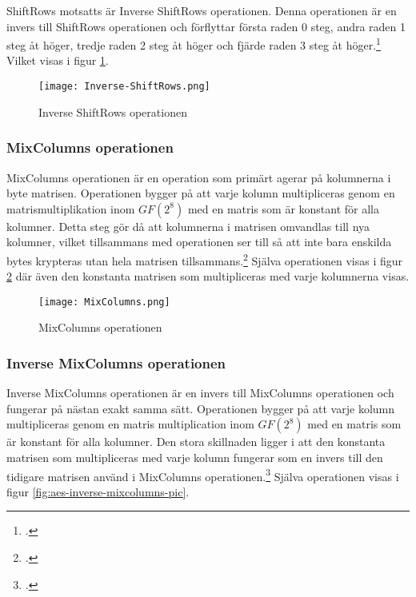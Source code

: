 ShiftRows motsatts är Inverse ShiftRows operationen. Denna operationen är en invers till ShiftRows operationen och förflyttar
första raden 0 steg, andra raden 1 steg åt höger, tredje raden 2 steg åt höger och fjärde raden 3 steg åt höger.\footcite{daemen1999aes}
Vilket visas i figur \ref{fig:aes-inverse-shiftrows-pic}.

\begin{figure}[H]
    \centering
    \texttt{[image: Inverse-ShiftRows.png]}
    \caption{Inverse ShiftRows operationen}
    \label{fig:aes-inverse-shiftrows-pic}
\end{figure}

\subsubsection{MixColumns operationen}
\label{sec:aes-mixcolumns}

MixColumns operationen är en operation som primärt agerar på kolumnerna i \gls{byte} matrisen. Operationen bygger på att varje kolumn multipliceras genom en
\gls{matrismultiplikation} inom \hyperref[sec:finite-fields]{$GF(2^8)$} med en matris som är konstant för alla kolumner. Detta steg gör då att kolumnerna i matrisen omvandlas till nya kolumner,
vilket tillsammans med  operationen ser till så att inte bara enskilda bytes krypteras utan hela matrisen tillsammans.\footcite{daemen1999aes} Själva operationen visas i figur \ref{fig:aes-mixcolumns-pic}
där även den konstanta matrisen som multipliceras med varje kolumnerna visas.

\begin{figure}[H]
    \centering
    \texttt{[image: MixColumns.png]}
    \caption{MixColumns operationen}
    \label{fig:aes-mixcolumns-pic}
\end{figure}

\subsubsection{Inverse MixColumns operationen}
\label{sec:aes-invers-mixcolumns}

Inverse MixColumns operationen är en invers till MixColumns operationen och fungerar på nästan exakt samma sätt. Operationen bygger på att varje kolumn multipliceras genom en
matris multiplication inom \hyperref[sec:finite-fields]{$GF(2^8)$} med en matris som är konstant för alla kolumner. Den stora skillnaden ligger i att den konstanta matrisen som multipliceras med varje kolumn fungerar
som en invers till den tidigare matrisen använd i MixColumns operationen.\footcite{daemen1999aes} Själva operationen visas i figur \ref{fig:aes-inverse-mixcolumns-pic}.

